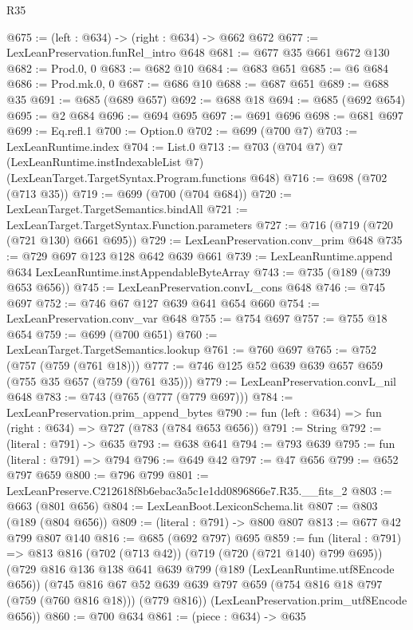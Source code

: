 \begin{lexlean}{R35}
\begin{coremodule}
@675 := (left : @634) -> (right : @634) -> @662 @672
@677 := LexLeanPreservation.funRel_intro @648
@681 := @677 @35 @661 @672 @130
@682 := Prod.{0, 0}
@683 := @682 @10
@684 := @683 @651
@685 := @6 @684
@686 := Prod.mk.{0, 0}
@687 := @686 @10
@688 := @687 @651
@689 := @688 @35
@691 := @685 (@689 @657)
@692 := @688 @18
@694 := @685 (@692 @654)
@695 := @2 @684
@696 := @694 @695
@697 := @691 @696
@698 := @681 @697
@699 := Eq.refl.{1}
@700 := Option.{0}
@702 := @699 (@700 @7)
@703 := LexLeanRuntime.index
@704 := List.{0}
@713 := @703
    (@704 @7)
    @7
    (LexLeanRuntime.instIndexableList @7)
    (LexLeanTarget.TargetSyntax.Program.functions @648)
@716 := @698 (@702 (@713 @35))
@719 := @699 (@700 (@704 @684))
@720 := LexLeanTarget.TargetSemantics.bindAll
@721 := LexLeanTarget.TargetSyntax.Function.parameters
@727 := @716 (@719 (@720 (@721 @130) @661 @695))
@729 := LexLeanPreservation.conv_prim @648
@735 := @729 @697 @123 @128 @642 @639 @661
@739 := LexLeanRuntime.append @634 LexLeanRuntime.instAppendableByteArray
@743 := @735 (@189 (@739 @653 @656))
@745 := LexLeanPreservation.convL_cons @648
@746 := @745 @697
@752 := @746 @67 @127 @639 @641 @654 @660
@754 := LexLeanPreservation.conv_var @648
@755 := @754 @697
@757 := @755 @18 @654
@759 := @699 (@700 @651)
@760 := LexLeanTarget.TargetSemantics.lookup
@761 := @760 @697
@765 := @752 (@757 (@759 (@761 @18)))
@777 := @746 @125 @52 @639 @639 @657 @659 (@755 @35 @657 (@759 (@761 @35)))
@779 := LexLeanPreservation.convL_nil @648
@783 := @743 (@765 (@777 (@779 @697)))
@784 := LexLeanPreservation.prim_append_bytes
@790 := fun (left : @634) => fun (right : @634) => @727 (@783 (@784 @653 @656))
@791 := String
@792 := (literal : @791) -> @635
@793 := @638 @641
@794 := @793 @639
@795 := fun (literal : @791) => @794
@796 := @649 @42
@797 := @47 @656
@799 := @652 @797 @659
@800 := @796 @799
@801 := LexLeanPreserve.C212618f8b6ebac3a5c1e1dd0896866e7.R35.__fits_2
@803 := @663 (@801 @656)
@804 := LexLeanBoot.LexiconSchema.lit
@807 := @803 (@189 (@804 @656))
@809 := (literal : @791) -> @800 @807
@813 := @677 @42 @799 @807 @140
@816 := @685 (@692 @797) @695
@859 := fun (literal : @791) =>
  @813
    @816
    (@702 (@713 @42))
    (@719 (@720 (@721 @140) @799 @695))
    (@729
      @816
      @136
      @138
      @641
      @639
      @799
      (@189 (LexLeanRuntime.utf8Encode @656))
      (@745
        @816
        @67
        @52
        @639
        @639
        @797
        @659
        (@754 @816 @18 @797 (@759 (@760 @816 @18)))
        (@779 @816))
      (LexLeanPreservation.prim_utf8Encode @656))
@860 := @700 @634
@861 := (piece : @634) -> @635

\end{coremodule}
\end{lexlean}
